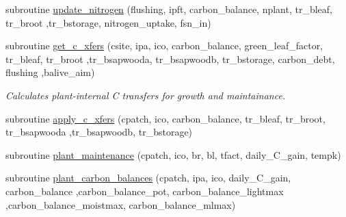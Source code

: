 \begin{DoxyCompactItemize}
\item 
subroutine \hyperlink{namespacegrowth__balive_a555ad92da5ad088f7161ea46d6ec8152}{update\+\_\+nitrogen} (flushing, ipft, carbon\+\_\+balance, nplant, tr\+\_\+bleaf, tr\+\_\+broot                                                                                                                                               ,tr\+\_\+bstorage, nitrogen\+\_\+uptake, fsn\+\_\+in)
\item 
subroutine \hyperlink{namespacegrowth__balive_a2308a9254122e6c26aaf642a88815ca3}{get\+\_\+c\+\_\+xfers} (csite, ipa, ico, carbon\+\_\+balance, green\+\_\+leaf\+\_\+factor, tr\+\_\+bleaf, tr\+\_\+broot                                                                                               ,tr\+\_\+bsapwooda, tr\+\_\+bsapwoodb, tr\+\_\+bstorage, carbon\+\_\+debt, flushing                                                                                                                       ,balive\+\_\+aim)
\begin{DoxyCompactList}\small\item\em Calculates plant-\/internal C transfers for growth and maintainance. \end{DoxyCompactList}\item 
subroutine \hyperlink{namespacegrowth__balive_a35d46b7fc86c4cecfe31abbc36713da2}{apply\+\_\+c\+\_\+xfers} (cpatch, ico, carbon\+\_\+balance, tr\+\_\+bleaf, tr\+\_\+broot, tr\+\_\+bsapwooda                                                                                                                               ,tr\+\_\+bsapwoodb, tr\+\_\+bstorage)
\item 
subroutine \hyperlink{namespacegrowth__balive_af977e6b599dfde9155a3ab3cb7175f16}{plant\+\_\+maintenance} (cpatch, ico, br, bl, tfact, daily\+\_\+\+C\+\_\+gain, tempk)
\item 
subroutine \hyperlink{namespacegrowth__balive_a9b1459d871399785ed2a6ec35e083b17}{plant\+\_\+carbon\+\_\+balances} (cpatch, ipa, ico, daily\+\_\+\+C\+\_\+gain, carbon\+\_\+balance                                                                                                                                                                                       ,carbon\+\_\+balance\+\_\+pot, carbon\+\_\+balance\+\_\+lightmax                                                                                                                                                                                       ,carbon\+\_\+balance\+\_\+moistmax, carbon\+\_\+balance\+\_\+mlmax)
\item 

\end{DoxyCompactItemize}
